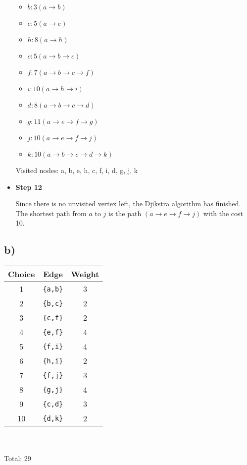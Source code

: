 \documentclass[11pt]{article}
\begin{document}
\begin{itemize}
    \begin{itemize}
        \item $b: 3 (a \rightarrow b)$
        \item $e: 5 (a \rightarrow e)$
        \item $h: 8 (a \rightarrow h)$
        \item $c: 5 (a \rightarrow b \rightarrow c)$
        \item $f: 7 (a \rightarrow b \rightarrow c \rightarrow f)$
        \item $i: 10 (a \rightarrow h \rightarrow i)$
        \item $d: 8 (a \rightarrow b \rightarrow c \rightarrow d)$
        \item $g: 11 (a \rightarrow e \rightarrow f \rightarrow g)$
        \item $j: 10 (a \rightarrow e \rightarrow f \rightarrow j)$
        \item $k: 10 (a \rightarrow b \rightarrow c \rightarrow d \rightarrow k)$
    \end{itemize}{}
    
    Visited nodes: a, b, e, h, c, f, i, d, g, j, k

\item \textbf{Step 12}

    Since there is no unvisited vertex left, the Djikstra algorithm has finished. The shortest path from $a$ to $j$ is the path $(a \rightarrow e \rightarrow f \rightarrow j)$ with the cost 10.

\end{itemize}{}
    
\subsection*{b)}
    \begin{table}[H]
        \centering
        \begin{tabular}{c|c|c}
             Choice & Edge & Weight \\
             \hline
             1  & \texttt{\{a,b\}} & 3 \\
             2  & \texttt{\{b,c\}} & 2 \\
             3  & \texttt{\{c,f\}} & 2 \\
             4  & \texttt{\{e,f\}} & 4 \\
             5  & \texttt{\{f,i\}} & 4 \\
             6  & \texttt{\{h,i\}} & 2 \\
             7  & \texttt{\{f,j\}} & 3 \\
             8  & \texttt{\{g,j\}} & 4 \\
             9  & \texttt{\{c,d\}} & 3 \\
             10 & \texttt{\{d,k\}} & 2
        \end{tabular}
        ~ \\
        ~ \\
        Total: 29
    \end{table}{}
    
\end{document}
